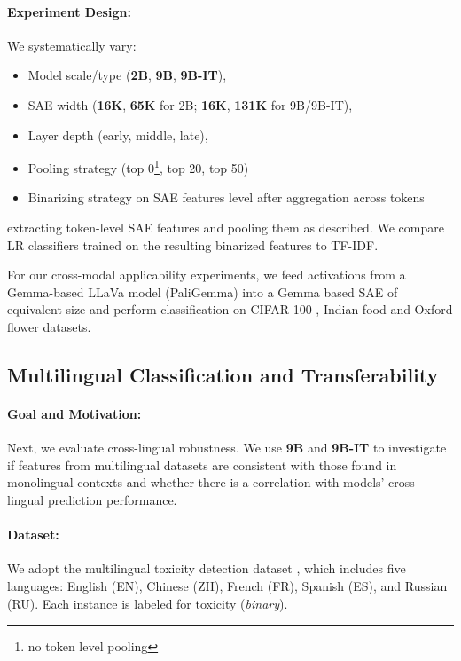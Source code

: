 \paragraph{Experiment Design:}
We systematically vary:
\begin{itemize}
    \item Model scale/type (\textbf{2B}, \textbf{9B}, \textbf{9B-IT}),
    \item SAE width (\textbf{16K}, \textbf{65K} for 2B; \textbf{16K}, \textbf{131K} for 9B/9B-IT),
    \item Layer depth (early, middle, late),
    \item Pooling strategy (top 0\footnote{no token level pooling}, top 20, top 50)
    \item Binarizing strategy on SAE features level after aggregation across tokens
\end{itemize}
extracting token-level SAE features and pooling them as described. We compare LR classifiers trained on the resulting binarized features to TF-IDF. 

For our cross-modal applicability experiments, we feed activations from a Gemma-based LLaVa model \cite{liu2023improvedllava} (PaliGemma) into a Gemma based SAE of equivalent size and perform classification on CIFAR 100 \cite{krizhevsky2009learning}, Indian food \cite{rajistics_indian_food_images} and Oxford flower \cite{Nilsback08} datasets. 

\subsection{Multilingual Classification and Transferability}
\label{sec:part2}

\paragraph{Goal and Motivation:}
Next, we evaluate cross-lingual robustness. We use \textbf{9B} and \textbf{9B-IT} to investigate if features from multilingual datasets are consistent with those found in monolingual contexts and whether there is a correlation with models’ cross-lingual prediction performance.
 
\paragraph{Dataset:}
We adopt the multilingual toxicity detection dataset \cite{dementieva2024overview}, which includes five languages: English (EN), Chinese (ZH), French (FR), Spanish (ES), and Russian (RU). Each instance is labeled for toxicity (\emph{binary}).

